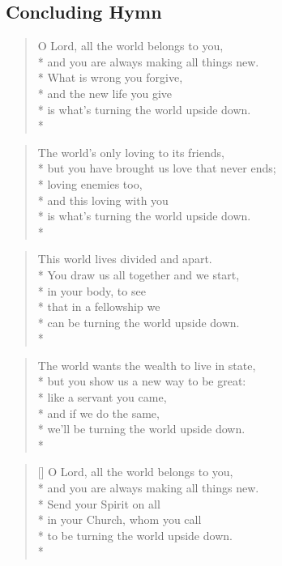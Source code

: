 \documentclass[12pt]{article}
\newcounter{count}
\newcommand\printcount{\addtocounter{count}{1}\thecount}
\begin{document}
\begin{center}
\subsection*{Concluding Hymn}
\end{center}
\begin{multicols}{2}
\setcounter{count}{0}
\setcounter{count}{0}
\begin{verse}
\flagverse{\printcount.} O Lord, all the world belongs to you,\\*
and you are always making all things new.\\*
What is wrong you forgive,\\*
and the new life you give\\*
is what's turning the world upside down.\\*
\end{verse}

\begin{verse}
\flagverse{\printcount.} The world's only loving to its friends,\\*
but you have brought us love that never ends;\\*
loving enemies too,\\*
and this loving with you\\*
is what's turning the world upside down.\\*
\end{verse}

\begin{verse}
\flagverse{\printcount.} This world lives divided and apart.\\*
You draw us all together and we start,\\*
in your body, to see\\*
that in a fellowship we\\*
can be turning the world upside down.\\*
\end{verse}

\begin{verse}
\flagverse{\printcount.} The world wants the wealth to live in state,\\*
but you show us a new way to be great:\\*
like a servant you came,\\*
and if we do the same,\\*
we'll be turning the world upside down.\\*
\end{verse}
\end{multicols}

\settowidth{\versewidth}{O Lord, all the world belongs to you,}
\begin{verse}[\versewidth]
\flagverse{\printcount.} O Lord, all the world belongs to you,\\*
and you are always making all things new.\\*
Send your Spirit on all\\*
in your Church, whom you call\\*
to be turning the world upside down.\\*
\end{verse}
\end{document}
